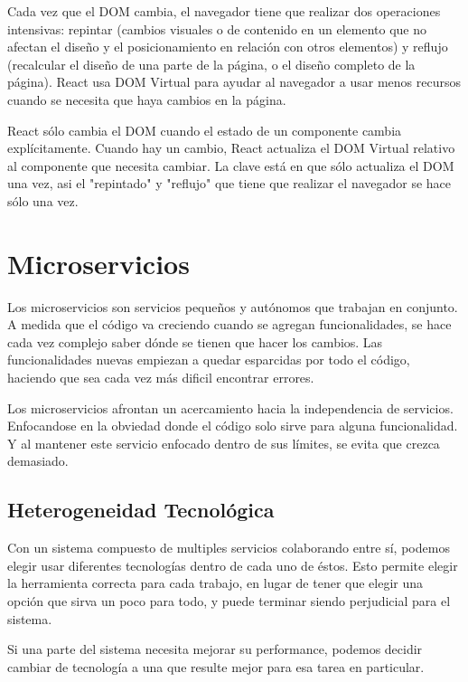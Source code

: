 Cada vez que el DOM cambia, el navegador tiene que realizar dos operaciones intensivas: repintar (cambios visuales o de contenido en un elemento que no afectan el diseño y el posicionamiento en relación con otros elementos) y reflujo (recalcular el diseño de una parte de la página, o el diseño completo de la página).
React usa DOM Virtual para ayudar al navegador a usar menos recursos cuando se necesita que haya cambios en la página.

React sólo cambia el DOM cuando el estado de un componente cambia explícitamente.
Cuando hay un cambio, React actualiza el DOM Virtual relativo al componente que necesita cambiar.
La clave está en que sólo actualiza el DOM una vez, asi el "repintado" y "reflujo" que tiene que realizar el navegador se hace sólo una vez.


\section[Microservicios]{Microservicios}

Los microservicios son servicios pequeños y autónomos que trabajan en conjunto. 
A medida que el código va creciendo cuando se agregan funcionalidades, se hace cada vez complejo saber dónde se tienen que hacer los cambios.
Las funcionalidades nuevas empiezan a quedar esparcidas por todo el código, haciendo que sea cada vez más dificil encontrar errores.

Los microservicios afrontan un acercamiento hacia la independencia de servicios. Enfocandose en la obviedad donde el código solo sirve para alguna funcionalidad. Y al mantener este servicio enfocado dentro de sus límites, se evita que crezca demasiado.

\subsection[Heterogeneidad Tecnológica]{Heterogeneidad Tecnológica}

Con un sistema compuesto de multiples servicios colaborando entre sí, podemos elegir usar diferentes tecnologías dentro de cada uno de éstos. Esto permite elegir la herramienta correcta para cada trabajo, en lugar de tener que elegir una opción que sirva un poco para todo, y puede terminar siendo perjudicial para el sistema.

Si una parte del sistema necesita mejorar su performance, podemos decidir cambiar de tecnología a una que resulte mejor para esa tarea en particular.


